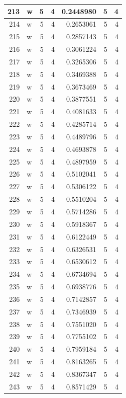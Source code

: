 \documentclass[
  letterpaper,
  DIV=11,
  numbers=noendperiod]{scrreprt}
\begin{document}
\begin{table}
\begin{tabular}[t]{r|l|r|r|r|r|r}
\hline
213 & w & 5 & 4 & 0.2448980 & 5 & 4\\
\hline
214 & w & 5 & 4 & 0.2653061 & 5 & 4\\
\hline
215 & w & 5 & 4 & 0.2857143 & 5 & 4\\
\hline
216 & w & 5 & 4 & 0.3061224 & 5 & 4\\
\hline
217 & w & 5 & 4 & 0.3265306 & 5 & 4\\
\hline
218 & w & 5 & 4 & 0.3469388 & 5 & 4\\
\hline
219 & w & 5 & 4 & 0.3673469 & 5 & 4\\
\hline
220 & w & 5 & 4 & 0.3877551 & 5 & 4\\
\hline
221 & w & 5 & 4 & 0.4081633 & 5 & 4\\
\hline
222 & w & 5 & 4 & 0.4285714 & 5 & 4\\
\hline
223 & w & 5 & 4 & 0.4489796 & 5 & 4\\
\hline
224 & w & 5 & 4 & 0.4693878 & 5 & 4\\
\hline
225 & w & 5 & 4 & 0.4897959 & 5 & 4\\
\hline
226 & w & 5 & 4 & 0.5102041 & 5 & 4\\
\hline
227 & w & 5 & 4 & 0.5306122 & 5 & 4\\
\hline
228 & w & 5 & 4 & 0.5510204 & 5 & 4\\
\hline
229 & w & 5 & 4 & 0.5714286 & 5 & 4\\
\hline
230 & w & 5 & 4 & 0.5918367 & 5 & 4\\
\hline
231 & w & 5 & 4 & 0.6122449 & 5 & 4\\
\hline
232 & w & 5 & 4 & 0.6326531 & 5 & 4\\
\hline
233 & w & 5 & 4 & 0.6530612 & 5 & 4\\
\hline
234 & w & 5 & 4 & 0.6734694 & 5 & 4\\
\hline
235 & w & 5 & 4 & 0.6938776 & 5 & 4\\
\hline
236 & w & 5 & 4 & 0.7142857 & 5 & 4\\
\hline
237 & w & 5 & 4 & 0.7346939 & 5 & 4\\
\hline
238 & w & 5 & 4 & 0.7551020 & 5 & 4\\
\hline
239 & w & 5 & 4 & 0.7755102 & 5 & 4\\
\hline
240 & w & 5 & 4 & 0.7959184 & 5 & 4\\
\hline
241 & w & 5 & 4 & 0.8163265 & 5 & 4\\
\hline
242 & w & 5 & 4 & 0.8367347 & 5 & 4\\
\hline
243 & w & 5 & 4 & 0.8571429 & 5 & 4\\

\end{tabular}
\end{table}
\end{document}
